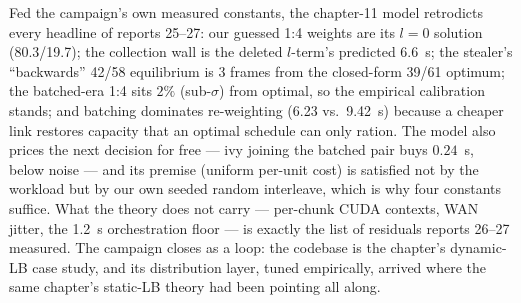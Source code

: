 \documentclass[
	english,
	letterpaper, oneside
]{article}
\begin{document}
Fed the campaign's own measured constants, the chapter-11 model
retrodicts every headline of reports 25--27: our guessed 1:4 weights are
its $l=0$ solution (80.3/19.7); the collection wall is the deleted
$l$-term's predicted 6.6~s; the stealer's ``backwards'' 42/58 equilibrium
is 3 frames from the closed-form 39/61 optimum; the batched-era 1:4 sits
$2\%$ (sub-$\sigma$) from optimal, so the empirical calibration stands;
and batching dominates re-weighting (6.23 vs.\ 9.42~s) because a cheaper
link restores capacity that an optimal schedule can only ration. The
model also prices the next decision for free --- ivy joining the batched
pair buys $0.24$~s, below noise --- and its premise (uniform per-unit
cost) is satisfied not by the workload but by our own seeded random
interleave, which is why four constants suffice. What the theory does not
carry --- per-chunk CUDA contexts, WAN jitter, the 1.2~s orchestration
floor --- is exactly the list of residuals reports 26--27 measured. The
campaign closes as a loop: the codebase is the chapter's dynamic-LB case
study, and its distribution layer, tuned empirically, arrived where the
same chapter's static-LB theory had been pointing all along.
\end{document}
